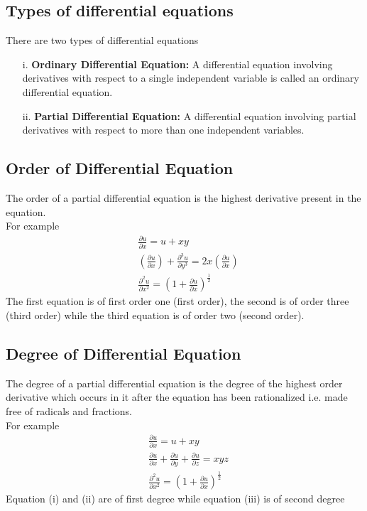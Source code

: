 \documentclass[12pt]{report}
\begin{document}
\subsection {Types of differential equations}
There are two types of differential equations
\begin{enumerate}
	\item[i.] \textbf{Ordinary Differential Equation:} A differential equation involving derivatives with respect to a single independent variable is called an ordinary differential equation.
  \item[ii.] \textbf{Partial Differential Equation:} A differential equation involving partial derivatives with respect to more than one independent variables. 
\end{enumerate}
\subsection{Order of Differential Equation}
\qquad The order of a partial differential equation is the highest derivative present in the equation.
\\
For example
\begin{align*}
& \frac{\partial u}{\partial x}=u+xy \tag{i}\\
& \left (\frac{\partial u}{\partial x}\right)+ \frac{\partial^3u}{\partial y^3}=2x\left(\frac{\partial u}{\partial x}\right) \tag{ii} \\
& \frac{\partial^2u}{\partial x^2}=\left(1+\frac{\partial u}{\partial x}\right)^{\frac{1}{2}}\tag{iii}
\end{align*}
The first equation is of first order one (first order), the second is of order three (third order) while the third equation is of order two (second order).
\subsection{Degree of Differential Equation}
\qquad The degree of a partial differential equation is the degree of the highest order derivative which occurs in it after the equation has been rationalized i.e. made free of radicals and fractions. \\
For example
\begin{align*}
& \frac{\partial u}{\partial x}=u+xy\tag{i}\\
& \frac{\partial u}{\partial x}+ \frac{\partial u}{\partial y}+\frac{\partial u}{\partial z}=xyz\tag{ii}\\
& \frac{\partial^2u}{\partial x^2}=\left(1+\frac{\partial u}{\partial x}\right)^{\frac{1}{2}}\tag{iii}
\end{align*}
Equation (i) and (ii) are of first degree while equation (iii) is of second degree
\end{document}
